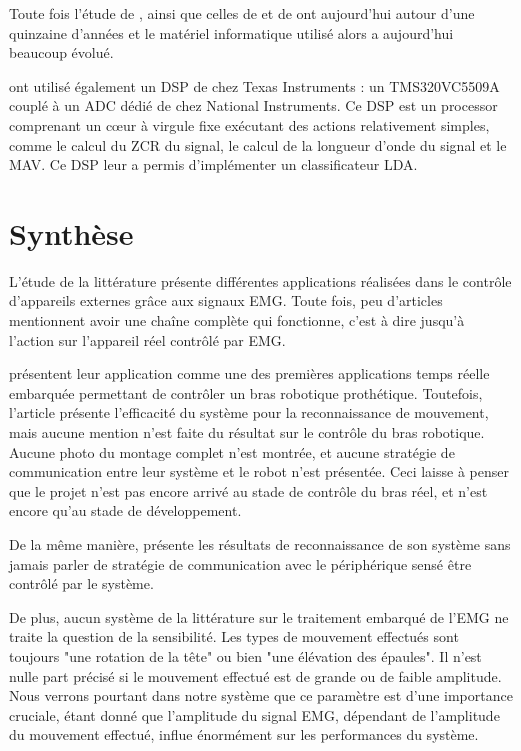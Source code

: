 \documentclass[letterpaper, twoside, 12pt, memoire, creativecommons, hyperref]{thETS}
\begin{document}
Toute fois l'étude de \cite{Chang1996}, ainsi que celles de \cite{martinez1999} et de \cite{Prasad1996} ont aujourd'hui autour d'une quinzaine d'années et le matériel informatique utilisé alors a aujourd'hui beaucoup évolué.

\cite{Tenore2007} ont utilisé également un DSP de chez Texas Instruments : un TMS320VC5509A couplé à un ADC dédié de chez National Instruments. Ce DSP est un processor comprenant un cœur à virgule fixe exécutant des actions relativement simples, comme le calcul du ZCR du signal, le calcul de la longueur d’onde du signal et le MAV. Ce DSP leur a permis d'implémenter un classificateur LDA.

\section{Synthèse}

L'étude de la littérature présente différentes applications réalisées dans le contrôle d'appareils externes grâce aux signaux EMG. Toute fois, peu d'articles mentionnent avoir une chaîne complète qui fonctionne, c'est à dire jusqu'à l'action sur l'appareil réel contrôlé par EMG.

\cite{Tenore2007} présentent leur application comme une des premières applications temps réelle embarquée permettant de contrôler un bras robotique prothétique. Toutefois, l'article présente l'efficacité du système pour la reconnaissance de mouvement, mais aucune mention n'est faite du résultat sur le contrôle du bras robotique. Aucune photo du montage complet n'est montrée, et aucune stratégie de communication entre leur système et le robot n'est présentée. Ceci laisse à penser que le projet n'est pas encore arrivé au stade de contrôle du bras réel, et n'est encore qu'au stade de développement. 

De la même manière, \cite{Chang1996} présente les résultats de reconnaissance de son système sans jamais parler de stratégie de communication avec le périphérique sensé être contrôlé par le système. 

De plus, aucun système de la littérature sur le traitement embarqué de l'EMG ne traite la question de la sensibilité. Les types de mouvement effectués sont toujours "une rotation de la tête" ou bien "une élévation des épaules". Il n'est nulle part précisé si le mouvement effectué est de grande ou de faible amplitude. Nous verrons pourtant dans notre système que ce paramètre est d'une importance cruciale, étant donné que l'amplitude du signal EMG, dépendant de l'amplitude du mouvement effectué, influe énormément sur les performances du système.
\end{document}
